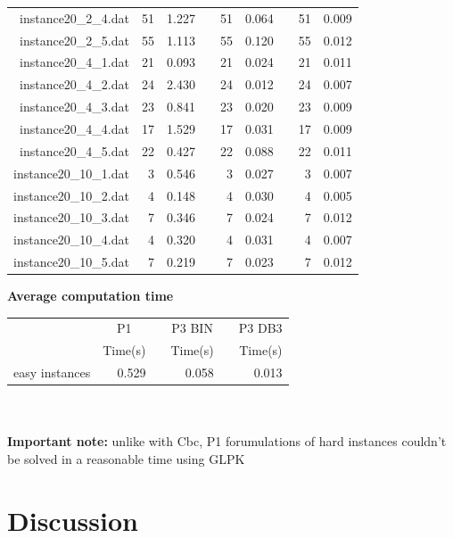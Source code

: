 \begin{table}[h!]
\begin{tabular}{@{}rrrcrrcrr@{}}
instance20\_2\_4.dat & 51 & 1.227 & & 51 & 0.064 & & 51 & 0.009 \\
instance20\_2\_5.dat & 55 & 1.113 & & 55 & 0.120 & & 55 & 0.012 \\
instance20\_4\_1.dat & 21 & 0.093 & & 21 & 0.024 & & 21 & 0.011 \\
instance20\_4\_2.dat & 24 & 2.430 & & 24 & 0.012 & & 24 & 0.007 \\
instance20\_4\_3.dat & 23 & 0.841 & & 23 & 0.020 & & 23 & 0.009 \\
instance20\_4\_4.dat & 17 & 1.529 & & 17 & 0.031 & & 17 & 0.009 \\
instance20\_4\_5.dat & 22 & 0.427 & & 22 & 0.088 & & 22 & 0.011 \\
instance20\_10\_1.dat & 3 & 0.546 & & 3 & 0.027 & & 3 & 0.007 \\
instance20\_10\_2.dat & 4 & 0.148 & & 4 & 0.030 & & 4 & 0.005 \\
instance20\_10\_3.dat & 7 & 0.346 & & 7 & 0.024 & & 7 & 0.012 \\
instance20\_10\_4.dat & 4 & 0.320 & & 4 & 0.031 & & 4 & 0.007 \\
instance20\_10\_5.dat & 7 & 0.219 & & 7 & 0.023 & & 7 & 0.012 \\
\end{tabular}
\end{table}
\newpage
\begin{center}
\textbf{Average computation time}
\end{center}
\begin{table}[h!]\centering
{}
\begin{tabular}{@{}rrcrcr@{}}\toprule
& \multicolumn{1}{c}{P1} & \phantom{abc} & \multicolumn{1}{c}{P3 BIN} & \phantom{abc} & \multicolumn{1}{c}{P3 DB3}\\
& Time(s) & & Time(s) & & Time(s)\\ \midrule
easy instances & 0.529 & & 0.058 & & 0.013 \\
\bottomrule
\end{tabular}
\end{table}\ \\\\
\textbf{Important note:} unlike with Cbc, P1 forumulations of hard instances couldn't be solved in a reasonable time using GLPK
\newpage
\chapter{Discussion}
